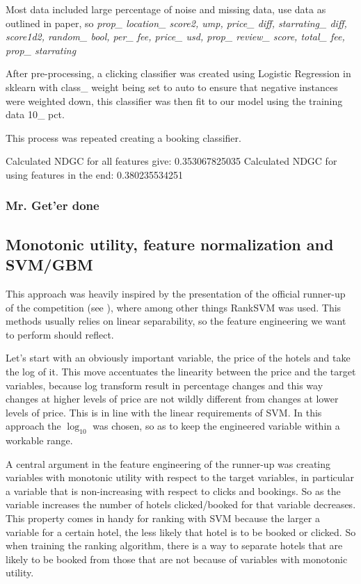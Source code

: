 \documentclass{llncs}
\begin{document}
Most data included large percentage of noise and missing data, use data as outlined in paper, so \textit{prop\_ location\_ score2, ump, price\_ diff, starrating\_ diff, score1d2, random\_ bool, per\_ fee, price\_ usd, prop\_ review\_ score, total\_ fee, prop\_ starrating}

After pre-processing, a clicking classifier was created using Logistic Regression in sklearn with class\_ weight being set to auto to ensure that negative instances were weighted down, this classifier was then fit to our model using the training data 10\_ pct.

This process was repeated creating a booking classifier.

Calculated NDGC for all features give: 0.353067825035
Calculated NDGC for using features in the end: 0.380235534251



\subsubsection*{Mr. Get'er done}


          
\subsection{Monotonic utility, feature normalization and SVM/GBM}
This approach was heavily inspired by the presentation of the official runner-up of the competition (see \cite{WinNT2}), where among other things RankSVM was used. This methods usually relies on linear separability, so the feature engineering we want to perform should reflect.

Let's start with an obviously important variable, the price of the hotels and take the log of it. This move accentuates the linearity between the price and the target variables, because log transform result in percentage changes and this way changes at higher levels of price are not wildly different from changes at lower levels of price. This is in line with the linear requirements of SVM. In this approach the $\log_{10}$ was chosen, so as to keep the engineered variable within a workable range.

A central argument in the feature engineering of the runner-up was creating variables with monotonic utility with respect to the target variables, in particular a variable that is non-increasing with respect to clicks and bookings. So as the variable increases the number of hotels clicked/booked for that variable decreases. This property comes in handy for ranking with SVM because the larger a variable for a certain hotel, the less likely that hotel is to be booked or clicked. So when training the ranking algorithm, there is a way to separate hotels that are likely to be booked from those that are not because of variables with monotonic utility.
\end{document}
